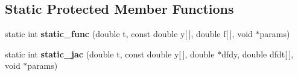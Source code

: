 \subsection*{Static Protected Member Functions}
\begin{DoxyCompactItemize}
\item 
\hypertarget{classkukadu_1_1DMPExecutor_ac58ec7a3b98134bcb84aff2b81ffc5c4}{static int {\bfseries static\-\_\-func} (double t, const double y\mbox{[}$\,$\mbox{]}, double f\mbox{[}$\,$\mbox{]}, void $\ast$params)}\label{classkukadu_1_1DMPExecutor_ac58ec7a3b98134bcb84aff2b81ffc5c4}

\item 
\hypertarget{classkukadu_1_1DMPExecutor_a10d8f15cdf66da21fc9e3d4a4d3555b8}{static int {\bfseries static\-\_\-jac} (double t, const double y\mbox{[}$\,$\mbox{]}, double $\ast$dfdy, double dfdt\mbox{[}$\,$\mbox{]}, void $\ast$params)}\label{classkukadu_1_1DMPExecutor_a10d8f15cdf66da21fc9e3d4a4d3555b8}

\end{DoxyCompactItemize}
